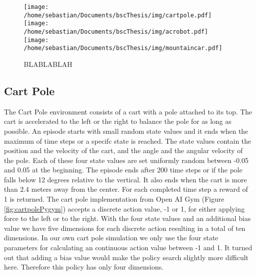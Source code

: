 \begin{figure}[h]
    \centering
    \texttt{[image: /home/sebastian/Documents/bscThesis/img/cartpole.pdf]}
    \texttt{[image: /home/sebastian/Documents/bscThesis/img/acrobot.pdf]}
    \texttt{[image: /home/sebastian/Documents/bscThesis/img/mountaincar.pdf]}

    \caption{BLABLABLAH}
    \label{fig:cartpoleacrobot}
\end{figure}

\subsection{Cart Pole}



The Cart Pole environment consists of a cart with a pole attached to its top. The cart is accelerated to the left or the right to balance the pole for as long as possible. An episode starts with small random state values and it ends when the maximum of time steps or a specifc state is reached. The state values contain the position and the velocity of the cart, and the angle and the angular velocity of the pole. Each of these four state values are set uniformly random between -0.05 and 0.05 at the beginning. The episode ends after 200 time steps or if the pole falls below 12 degrees relative to the vertical. It also ends when the cart is more than 2.4 meters away from the center. For each completed time step a reward of 1 is returned. The cart pole implementation from Open AI Gym (Figure \ref{fig:cartpolePygym}) accepts a discrete action value, -1 or 1, for either applying force to the left or to the right. With the four state values and an additional bias value we have five dimensions for each discrete action resulting in a total of ten dimensions. In our own cart pole simulation we only use the four state parameters for calculating an continuous action value between -1 and 1. It turned out that adding a bias value would make the policy search slightly more difficult here. Therefore this policy has only four dimensions.

